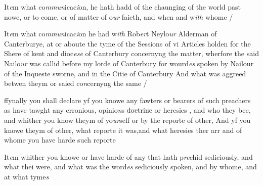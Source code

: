 \documentclass[12pt, a4paper]{book}
\begin{document}
	
				\marginpar[\vspace{0.5cm}{\textcolor{Gray}{17}}]{}
			
	
		\ifthenelse{\isodd{\thepage}}
		{\reversemarginpar}
		{\normalmarginpar}
		 It\textit{e}m what co\textit{mmun}icac\textit{i}on, he hath hadd of the chaunging of the world
 past nowe, or to come, or of matter of o\textit{ur} faieth, and when
 and w\textit{ith} whome /



				\marginpar[\vspace{0.5cm}{\textcolor{Gray}{18}}]{}
			
	
		\ifthenelse{\isodd{\thepage}}
		{\reversemarginpar}
		{\normalmarginpar}
		 It\textit{e}m what co\textit{mmun}icac\textit{i}on he had w\textit{ith} Rob\textit{er}t Neylo\textit{ur} Alderman of
		Canterburye, at or aboute the tyme of the Sessions of
		vi Articles holden for the Shere of kent and dioc\textit{ese} of Canterbury
		concernyng the matter, wherfore the said Nailo\textit{ur} was callid
		before my lorde of Canterbury for wourd\textit{es} spoken by Nailour
		of the Inqueste sworne, and in
			 the Citie of Canterbury
 And what was aggreed betwen theym or saied co\textit{n}cernyng
 the same /


	
				\marginpar[\vspace{0.5cm}{\textcolor{Gray}{19}}]{}
			
	
		\ifthenelse{\isodd{\thepage}}
		{\reversemarginpar}
		{\normalmarginpar}
		 ffynally you shall declare yf you knowe any fawters or
 bearers of such preachers as have tawght any erronious, opinio\textit{n}s
 \sout{doctrine} or heresies
			, and who they bee, and whither you know theym
 of yo\textit{ur}self or by the reporte of other, And yf you knowe theym
 of other, what reporte it was,and what heresies ther arr
 and of whome you have harde such reporte



	
				\marginpar[\vspace{0.5cm}{\textcolor{Gray}{20}}]{}
			
	
		\ifthenelse{\isodd{\thepage}}
		{\reversemarginpar}
		{\normalmarginpar}
		 It\textit{e}m whither you knowe or have harde of any that hath p\textit{re}chid
 sediciously, and what thei were, and what was the word\textit{es}
 sediciously spoken, and by whome, and at what tyme\textit{s}

               
\dotfill
					
\end{document}
